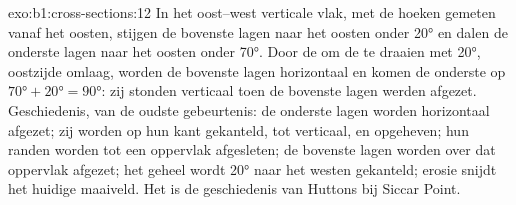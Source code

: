 \begin{solution}{exo:b1:cross-sections:12}
In het oost--west verticale vlak, met de hoeken gemeten vanaf het oosten, stijgen de bovenste lagen naar het oosten
onder \ang{20} en dalen de onderste lagen naar het oosten onder \ang{70}. Door de  om de  te
draaien met \ang{20}, oostzijde omlaag, worden de bovenste lagen horizontaal en komen de onderste op
$\ang{70} + \ang{20} = \ang{90}$: zij stonden verticaal toen de bovenste lagen werden afgezet. Geschiedenis, van de
oudste gebeurtenis: de onderste lagen worden horizontaal afgezet; zij worden op hun kant gekanteld, tot verticaal,
en opgeheven; hun randen worden tot een oppervlak afgesleten; de bovenste lagen worden over dat oppervlak afgezet;
het geheel wordt \ang{20} naar het westen gekanteld; erosie snijdt het huidige maaiveld. Het is de geschiedenis van
Huttons  bij Siccar Point.
\end{solution}

